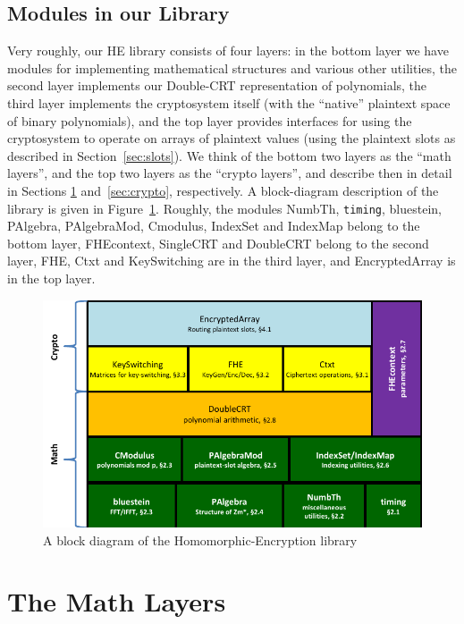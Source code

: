 \documentclass[14pt]{extarticle}
\newcommand{\secref}[1]{Section~\protect\ref{sec:#1}}
\newcommand{\figref}[1]{Figure~\protect\ref{fig:#1}}
\def\NumbTh{\textsf{NumbTh}}
\def\bluestein{\textsf{bluestein}}
\def\PAlgebra{\textsf{PAlgebra}}
\def\PAlgebraMod{\textsf{PAlgebraMod}}
\def\Cmodulus{\textsf{Cmodulus}}
\def\IndexSet{\textsf{IndexSet}}
\def\IndexMap{\textsf{IndexMap}}
\def\SingleCRT{\textsf{SingleCRT}}
\def\DoubleCRT{\textsf{DoubleCRT}}
\def\FHE{\textsf{FHE}}
\def\Ctxt{\textsf{Ctxt}}
\def\FHEcontext{\textsf{FHEcontext}}
\def\EncryptedArray{\textsf{EncryptedArray}}
\def\KeySwitching{\textsf{KeySwitching}}
\begin{document}
\subsection{Modules in our Library} \label{sec:modules}
Very roughly, our HE library consists of four layers: in the bottom
layer we have modules for implementing mathematical structures and
various other utilities, the second layer implements our Double-CRT
representation of polynomials, the third layer implements the
cryptosystem itself (with the ``native'' plaintext space of binary
polynomials), and the top layer provides interfaces for using the
cryptosystem to operate on arrays of plaintext values (using the
plaintext slots as described in \secref{slots}). We think of the
bottom two layers as the ``math layers'', and the top two layers
as the ``crypto layers'', and describe then in detail in Sections
\ref{sec:math} and~\ref{sec:crypto}, respectively. A block-diagram
description of the library is given in \figref{blocks}. Roughly,
the modules {\NumbTh}, \texttt{timing}, {\bluestein}, {\PAlgebra},
{\PAlgebraMod}, {\Cmodulus}, {\IndexSet} and
{\IndexMap} belong to the bottom layer,  {\FHEcontext}, {\SingleCRT}
and {\DoubleCRT} belong to the second layer, {\FHE}, {\Ctxt} and
{\KeySwitching} are in the third layer, and {\EncryptedArray} 
is in the top layer.

\begin{figure}
\ifpdf
\centerline{\includegraphics{HElibrary.pdf}}
\else
\vspace{2in}
\fi
\caption{A block diagram of the Homomorphic-Encryption library}
\label{fig:blocks}
\end{figure}

\section{The Math Layers} \label{sec:math}
\end{document}
